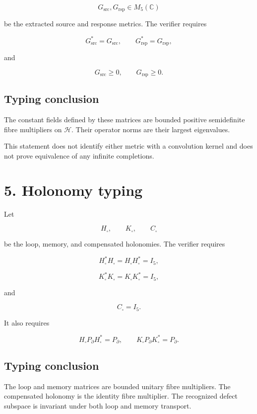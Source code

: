 \[
G_{\mathrm{src}},G_{\mathrm{rsp}}\in M_5(\mathbb C)
\]

be the extracted source and response metrics. The verifier requires

\[
G_{\mathrm{src}}^*=G_{\mathrm{src}},
\qquad
G_{\mathrm{rsp}}^*=G_{\mathrm{rsp}},
\]

and

\[
G_{\mathrm{src}}\ge0,
\qquad
G_{\mathrm{rsp}}\ge0.
\]

\hypertarget{typing-conclusion-1}{%
\subsection{Typing conclusion}\label{typing-conclusion-1}}

The constant fields defined by these matrices are bounded positive
semidefinite fibre multipliers on \(\mathcal H\). Their operator norms are their
largest eigenvalues.

This statement does not identify either metric with a convolution kernel and
does not prove equivalence of any infinite completions.

\hypertarget{holonomy-typing}{%
\section{5. Holonomy typing}\label{holonomy-typing}}

Let

\[
H_\square,
\qquad
K_\square,
\qquad
C_\square
\]

be the loop, memory, and compensated holonomies. The verifier requires

\[
H_\square^*H_\square=H_\square H_\square^*=I_5,
\]

\[
K_\square^*K_\square=K_\square K_\square^*=I_5,
\]

and

\[
C_\square=I_5.
\]

It also requires

\[
H_\square P_\partial H_\square^*=P_\partial,
\qquad
K_\square P_\partial K_\square^*=P_\partial.
\]

\hypertarget{typing-conclusion-2}{%
\subsection{Typing conclusion}\label{typing-conclusion-2}}

The loop and memory matrices are bounded unitary fibre multipliers. The
compensated holonomy is the identity fibre multiplier. The recognized defect
subspace is invariant under both loop and memory transport.

